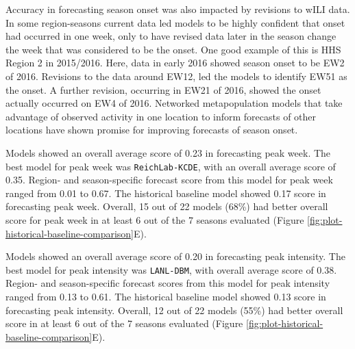 \documentclass[9pt,twocolumn,twoside]{pnas-new}\usepackage[]{graphicx}\usepackage[]{color}
\begin{document}
Accuracy in forecasting season onset was also impacted by revisions to wILI data. In some region-seasons current data led models to be highly confident that onset had occurred in one week, only to have revised data later in the season change the week that was considered to be the onset. One good example of this is HHS Region 2 in 2015/2016. Here, data in early 2016 showed season onset to be EW2 of 2016. Revisions to the data around EW12, led the models to identify EW51 as the onset. A further revision, occurring in EW21 of 2016, showed the onset actually occurred on EW4 of 2016.
Networked metapopulation models that take advantage of observed activity in one location to inform forecasts of other locations have shown promise for improving forecasts of season onset.\cite{Pei2018}



Models showed an overall average score of 
0.23
in forecasting peak week. 
The best model for peak week was 
{\tt ReichLab-KCDE}, 
with an overall average score of 
0.35. 
Region- and season-specific forecast score from this model for peak week ranged from
0.01 to 
0.67.
The historical baseline model showed 
0.17 
score in forecasting peak week.
Overall, 15 out of 22 models (68\%) had better overall score for peak week in at least 6 out of the 7 seasons evaluated (Figure \ref{fig:plot-historical-baseline-comparison}E).

Models showed an overall average score of 
0.20
in forecasting peak intensity. 
The best model for peak intensity was 
{\tt LANL-DBM}, 
with overall average score of 
0.38. 
Region- and season-specific forecast scores from this model for peak intensity ranged from
0.13 to 
0.61.
The historical baseline model showed 
0.13 
score in forecasting peak intensity.
Overall, 12 out of 22 models (55\%) had better overall score in at least 6 out of the 7 seasons evaluated (Figure \ref{fig:plot-historical-baseline-comparison}E).

\end{document}
